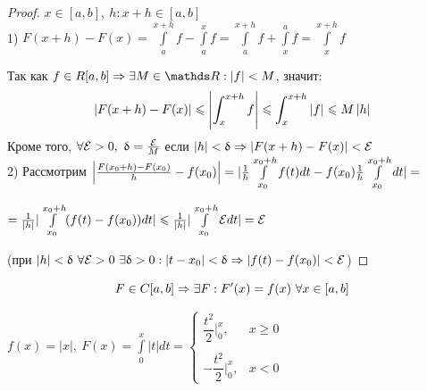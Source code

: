 \documentclass[matan]{subfiles}
\begin{document}
  \begin{proof}
      $x \in [a,b],\ h:x+h \in [a,b]$
      \\
      1) $F(x+h)-F(x)= \int\limits_a^{x+h} f - \int\limits_a^x f = \int\limits_a^{x+h} f + \int\limits_x^a f = \int\limits_x^{x+h} f$

      Так как $f \in R[a,b] \Rightarrow \e M \in \R: |f|< M$, значит:
      \[\left|F(x + h) - F(x)\right| \leqslant \left|\int_x^{x + h} f \right| \leqslant \int_x^{x + h}\left|f\right| \leqslant M \left|h\right| \]
      Кроме того, $\forall \mathcal{E} > 0,\ \updelta = \frac{\mathcal{E}}{M}$ если $|h| < \updelta \Rightarrow |F(x+h)-F(x)|  < \mathcal{E}$
      \\
  2) Рассмотрим $\left|\frac{F(x_0+h)-F(x_0)}{h}-f(x_0)\right| =|\frac{1}{h} \int\limits_{x_0}^{x_0+h} f(t) dt - f(x_0) \frac{1}{h} \int\limits_{x_0}^{x_0+h} dt| =$

      $=\frac{1}{|h|} |\int\limits_{x_0}^{x_0+h} (f(t)-f(x_0)) dt| \leqslant \frac{1}{|h|}|\int\limits_{x_0}^{x_0+h} \mathcal{E} dt| = \mathcal{E}$

      (при $|h| < \updelta\ \forall \E > 0\ \e \updelta > 0: |t-x_0|<\updelta \Rightarrow |f(t)-f(x_0)|< \E$)
  \end{proof}

  \begin{Consequence}
      \[F \in C[a,b] \Rightarrow \exists F: F'(x)=f(x)\ \forall x \in [a,b]\]
  \end{Consequence}

  \begin{example}
      $f(x) = |x|,\ F(x) = \int\limits_0^x |t| dt =
       \begin{cases}
         \dfrac{t^2}{2} \Big|_0^x,& x \geqslant 0\\
         \\
         -\dfrac{t^2}{2} \Big|_0^x,& x < 0
       \end{cases}$
  \end{example}
\end{document}
